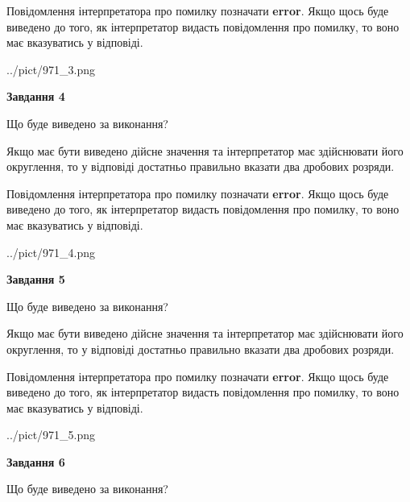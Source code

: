 \documentclass[12pt, ukrainian]{article}
\begin{document}
{\begin {Large}
Повідомлення інтерпретатора про помилку позначати \textbf{error}.
Якщо щось буде виведено до того, як інтерпретатор видасть повідомлення про помилку, 
то воно має вказуватись у відповіді. \par

\begin{center}
	{../pict/971_3.png}
\end{center}
\newpage

{\begin {center}\textbf{Завдання 4}\end {center}}\par
Що буде виведено за виконання? \par

Якщо має бути виведено дійсне значення та інтерпретатор має здійснювати його округлення, 
то у відповіді достатньо правильно вказати два дробових розряди.

Повідомлення інтерпретатора про помилку позначати \textbf{error}.
Якщо щось буде виведено до того, як інтерпретатор видасть повідомлення про помилку, 
то воно має вказуватись у відповіді. \par

\begin{center}
	{../pict/971_4.png}
\end{center}
\newpage

{\begin {center}\textbf{Завдання 5}\end {center}}\par
Що буде виведено за виконання? \par

Якщо має бути виведено дійсне значення та інтерпретатор має здійснювати його округлення, 
то у відповіді достатньо правильно вказати два дробових розряди.

Повідомлення інтерпретатора про помилку позначати \textbf{error}.
Якщо щось буде виведено до того, як інтерпретатор видасть повідомлення про помилку, 
то воно має вказуватись у відповіді. \par

\begin{center}
	{../pict/971_5.png}
\end{center}
\newpage

{\begin {center}\textbf{Завдання 6}\end {center}}\par
Що буде виведено за виконання? \par


\end{Large}}
\end{document}
